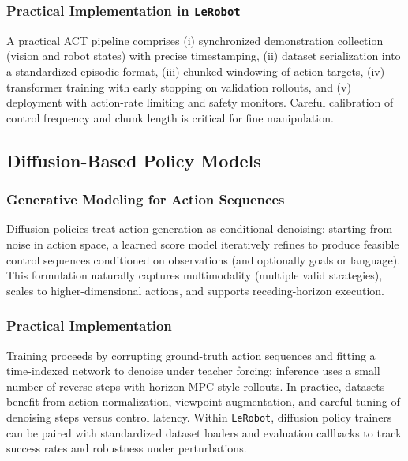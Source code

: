 \subsubsection{Practical Implementation in \texttt{LeRobot}}
A practical ACT pipeline comprises (i) synchronized demonstration collection (vision and robot states) with precise timestamping, (ii) dataset serialization into a standardized episodic format, (iii) chunked windowing of action targets, (iv) transformer training with early stopping on validation rollouts, and (v) deployment with action-rate limiting and safety monitors. Careful calibration of control frequency and chunk length is critical for fine manipulation.

\subsection{Diffusion-Based Policy Models}
\subsubsection{Generative Modeling for Action Sequences}
Diffusion policies treat action generation as conditional denoising: starting from noise in action space, a learned score model iteratively refines to produce feasible control sequences conditioned on observations (and optionally goals or language). This formulation naturally captures multimodality (multiple valid strategies), scales to higher-dimensional actions, and supports receding-horizon execution.

\subsubsection{Practical Implementation}
Training proceeds by corrupting ground-truth action sequences and fitting a time-indexed network to denoise under teacher forcing; inference uses a small number of reverse steps with horizon MPC-style rollouts. In practice, datasets benefit from action normalization, viewpoint augmentation, and careful tuning of denoising steps versus control latency. Within \texttt{LeRobot}, diffusion policy trainers can be paired with standardized dataset loaders and evaluation callbacks to track success rates and robustness under perturbations.